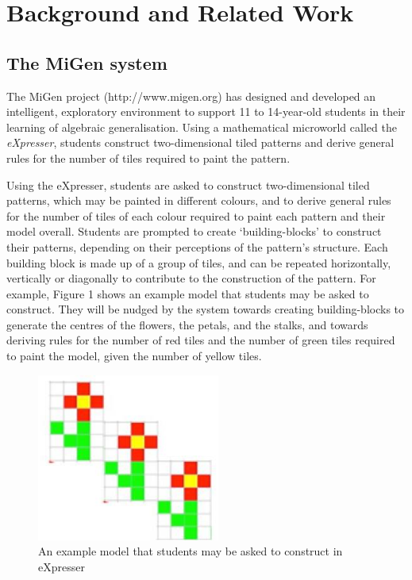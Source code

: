 
\section{Background and Related Work}
\label{sec:backgr-relat-work}


\subsection{The MiGen system}
\label{sec:migen-system}

The MiGen project (http://www.migen.org) has designed and developed an
intelligent, exploratory environment to support 11 to 14-year-old
students in their learning of algebraic generalisation. Using a
mathematical microworld called the {\em eXpresser}, students construct
two-dimensional tiled patterns and derive general rules for the number
of tiles required to paint the pattern. 

Using the eXpresser, students are asked to construct
two-dimensional tiled patterns, which may be painted in different
colours, and to derive general rules for the number of tiles of each
colour required to paint each pattern and their model
overall. Students are prompted to create `building-blocks' to
construct their patterns, depending on their perceptions of the
pattern’s structure. Each building block is made up of a group of
tiles, and can be repeated horizontally, vertically or diagonally to
contribute to the construction of the pattern. For example, Figure 1
shows an example model that students may be asked to construct. They
will be nudged by the system towards creating building-blocks to
generate the centres of the flowers, the petals, and the stalks, and
towards deriving rules for the number of red tiles and the number of
green tiles required to paint the model, given the number of yellow
tiles.

\begin{figure}[htbp]
  \centering
  \includegraphics[width=6cm]{gfx/example.eps}
  \caption{An example model that students may be asked to construct in
    eXpresser} 
  \label{fig:example}
\end{figure}


